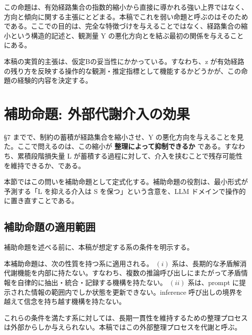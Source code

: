 \documentclass[12pt,a4paper]{article}
\begin{document}
この命題は、有効経路集合の指数的縮小から直接に導かれる強い上界ではなく、方向と傾向に関する主張にとどまる。本稿でこれを弱い命題と呼ぶのはそのためである。ここでの目的は、完全な特徴づけを与えることではなく、経路集合の縮小という構造的記述と、観測量 Y の悪化方向とを結ぶ最初の関係を与えることにある。

本稿の実質的主張は、仮定Bの妥当性にかかっている。すなわち、z が有効経路の残り方を反映する操作的な観測・推定指標として機能するかどうかが、この命題の経験的内容を決定する。

\section{補助命題: 外部代謝介入の効果}\label{ux88dcux52a9ux547dux984c-ux5916ux90e8ux4ee3ux8b1dux4ecbux5165ux306eux52b9ux679c}

§7 までで、制約の蓄積が経路集合を縮小させ、Y の悪化方向を与えることを見た。ここで問えるのは、この縮小が \textbf{整理によって抑制できるか} である。すなわち、累積段階損失量 L が蓄積する過程に対して、介入を挟むことで残存可能性を維持できるか、である。

本節ではこの問いを補助命題として定式化する。補助命題の役割は、最小形式が予測する「L を抑える介入は S を保つ」という含意を、LLM ドメインで操作的に置き直すことである。

\subsection{補助命題の適用範囲}\label{ux88dcux52a9ux547dux984cux306eux9069ux7528ux7bc4ux56f2}

補助命題を述べる前に、本稿が想定する系の条件を明示する。

\begin{assumption}[想定する系の条件]
本補助命題は、次の性質を持つ系に適用される。
$(i)$ 系は、長期的な矛盾解消代謝機能を内部に持たない。すなわち、複数の推論呼び出しにまたがって矛盾情報を自律的に抽出・統合・記録する機構を持たない。
$(ii)$ 系は、prompt に提示された情報の範囲内でしか状態を更新できない。inference 呼び出しの境界を越えて信念を持ち越す機構を持たない。
\end{assumption}

これらの条件を満たす系に対しては、長期一貫性を維持するための整理プロセスは外部からしか与えられない。本稿ではこの外部整理プロセスを代謝と呼ぶ。
\end{document}

